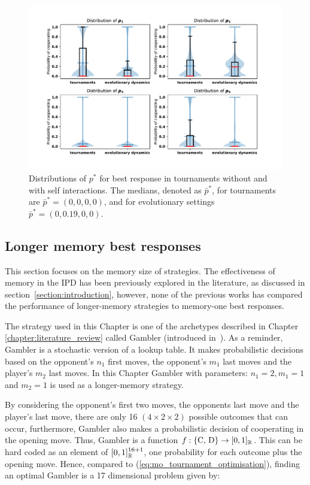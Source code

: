 \begin{figure}[!htbp]
    \centering
    \includegraphics[width=.9\textwidth]{src/chapters/05/paper/memory-size-in-the-prisoners-dilemma/img/behaviour_violin_plots.pdf}
    \caption{Distributions of \(p^*\) for best response in tournaments without
     and with self interactions. The medians, denoted as \(\bar{p}^*\), for
     tournaments are \(\bar{p}^* = (0, 0, 0, 0)\), and for evolutionary settings
     \(\bar{p}^* = (0, 0.19, 0, 0)\).}
    \label{fig:behaviour_violin_plots}
\end{figure}

\subsection{Longer memory best responses}\label{subsection:longer_memory_best_response}

This section focuses on the memory size of strategies. The effectiveness of
memory in the IPD has been previously explored in the literature, as
discussed in section~\ref{section:introduction}, however, none of the
previous works has compared the performance of longer-memory strategies to
memory-one best responses.

The strategy used in this Chapter is one of the archetypes described in Chapter
\ref{chapter:literature_review} called Gambler (introduced
in~\cite{Knight2017}). As a reminder, Gambler is a stochastic version of a lookup
table. It makes probabilistic decisions based on the opponent's \(n_1\) first
moves, the opponent's \(m_1\) last moves and the player's \(m_2\) last moves.
In this Chapter Gambler with parameters: $n_1 = 2, m_1 = 1$ and $m_2
= 1$ is used as a longer-memory strategy.

By considering the opponent's first two moves, the opponents last move and the
player's last move, there are only 16 $(4 \times 2 \times 2)$ possible outcomes
that can occur, furthermore, Gambler also makes a probabilistic decision of
cooperating in the opening move. Thus, Gambler is a function \(f: \{\text{C,
D}\} \rightarrow [0, 1]_{\mathbb{R}}\). This can be hard coded as an element
of \([0, 1]_{\mathbb{R}} ^ {16 + 1}\), one probability for each outcome plus the opening
move. Hence, compared to (\ref{eq:mo_tournament_optimisation}), finding an
optimal Gambler is a 17 dimensional problem given by:

